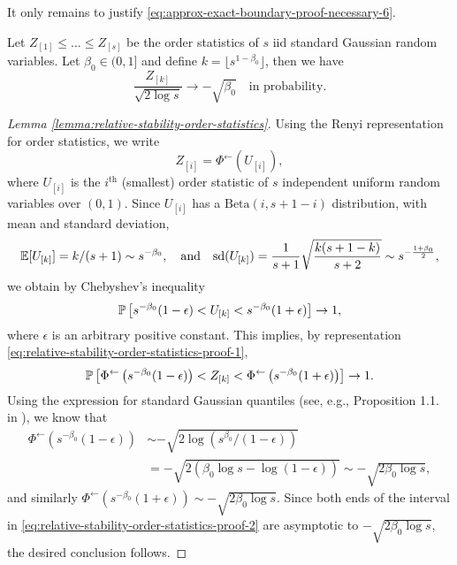 It only remains to justify \eqref{eq:approx-exact-boundary-proof-necessary-6}.

\begin{lemma}
\label{lemma:relative-stability-order-statistics}
Let $Z_{[1]} \le \ldots \le Z_{[s]}$ be the order statistics of $s$ iid standard Gaussian random variables.
Let $\beta_0\in(0,1]$ and define $k=\lfloor s^{1-\beta_0}\rfloor$, then we have
\begin{equation}
    \frac{Z_{[k]}}{\sqrt{2\log{s}}} \to -\sqrt{\beta_0} \quad\text{in probability}.
\end{equation}
\end{lemma}

\begin{proof}[Lemma \ref{lemma:relative-stability-order-statistics}]
Using the Renyi representation for order statistics, we write
\begin{equation} \label{eq:relative-stability-order-statistics-proof-1}
    Z_{[i]} = \Phi^{\leftarrow}(U_{[i]}),
\end{equation}
where $U_{[i]}$ is the $i^\mathrm{th}$ (smallest) order statistic of $s$ independent uniform random variables over $(0,1)$.
Since $U_{[i]}$ has a $\mathrm{Beta}(i, s+1-i)$ distribution, with mean and standard deviation,
$$
\E[U_{[k]}] = k/(s+1) \sim s^{-\beta_0}, 
\quad \text{and} \quad
{\mathrm{sd}(U_{[k]})} = \frac{1}{s+1}\sqrt{\frac{k(s+1-k)}{s+2}} \sim s^{-\frac{1+\beta_0}{2}},
$$
we obtain by Chebyshev's inequality 
$$
\P\left[s^{-\beta_0}(1-\epsilon) < U_{[k]} < s^{-\beta_0}(1+\epsilon)\right] \to 1,
$$
where $\epsilon$ is an arbitrary positive constant.
This implies, by representation \eqref{eq:relative-stability-order-statistics-proof-1},
\begin{equation} \label{eq:relative-stability-order-statistics-proof-2}
    \P\left[\Phi^{\leftarrow}\left(s^{-\beta_0}(1-\epsilon)\right) < Z_{[k]} < \Phi^{\leftarrow}\left(s^{-\beta_0}(1+\epsilon)\right)\right] \to 1.
\end{equation}
Using the expression for standard Gaussian quantiles (see, e.g., Proposition 1.1. in \cite{gao2018fundamental}), we know that
\begin{align*}
    \Phi^{\leftarrow}\left(s^{-\beta_0}(1-\epsilon)\right) 
    &\sim -\sqrt{2\log{\left(s^{\beta_0}/(1-\epsilon)\right)}} \\
    &= -\sqrt{2(\beta_0\log{s} - \log{(1-\epsilon)})} \sim -\sqrt{2\beta_0\log{s}},
\end{align*}
and similarly $\Phi^{\leftarrow}\left(s^{-\beta_0}(1+\epsilon)\right)\sim -\sqrt{2\beta_0\log{s}}$.
Since both ends of the interval in \eqref{eq:relative-stability-order-statistics-proof-2} are asymptotic to $-\sqrt{2\beta_0\log{s}}$, 
the desired conclusion follows.
\end{proof}

